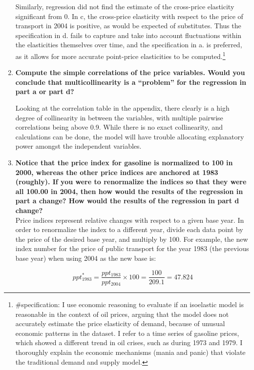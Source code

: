\documentclass{article}
\begin{document}
\begin{enumerate}[label=\alph*.]
Similarly, regression did not find the estimate of the cross-price elasticity significant from 0. In c, the cross-price elasticity with respect to the price of transport in 2004 is positive, as would be expected of substitutes. Thus the specification in d. fails to capture and take into account fluctuations within the elasticities themselves over time, and the specification in a. is preferred, as it allows for more accurate point-price elasticities to be computed.\footnote{\#specification: I use economic reasoning to evaluate if an isoelastic model is reasonable in the context of oil prices, arguing that the model does not accurately estimate the price elasticity of demand, because of unusual economic patterns in the dataset. I refer to a time series of gasoline prices, which showed a different trend in oil crises, such as during 1973 and 1979. I thoroughly explain the economic mechanisms (mania and panic) that violate the traditional demand and supply model.}

\newpage
\item \textbf{Compute the simple correlations of the price variables. Would you conclude that multicollinearity is a ``problem'' for the regression in part a or part d?}

Looking at the correlation table in the appendix, there clearly is a high degree of collinearity in between the variables, with multiple pairwise correlations being above 0.9. While there is no exact collinearity, and calculations can be done, the model will have trouble allocating explanatory power amongst the independent variables.


\item \textbf{Notice that the price index for gasoline is normalized to 100 in 2000, whereas the other price indices are anchored at 1983 (roughly). If you were to renormalize the indices so that they were all 100.00 in 2004, then how would the results of the regression in part a change? How would the results of the regression in part d change?}\\

Price indices represent relative changes with respect to a given base year. In order to renormalize the index to a different year, divide each data point by the price of the desired base year, and multiply by 100. For example, the new index number for the price of public transport for the year 1983 (the previous base year) when using 2004 as the new base is:

$$ ppt_{1983}^* = \frac{ppt_{1983}}{ppt_{2004}}\times 100 = \frac{100}{209.1} = 47.824$$


\end{enumerate}
\end{document}

